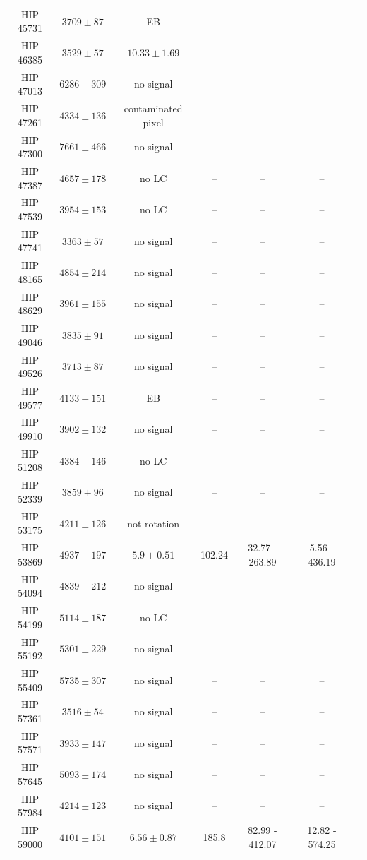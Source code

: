 \begin{longtable}{|c|c|c|c|c|c|c|}
HIP 45731 & $ 3709 \pm 87 $ &EB &-- &-- &-- \\
HIP 46385 & $ 3529 \pm 57 $ & $ 10.33 \pm 1.69 $ &-- &-- &-- \\
HIP 47013 & $ 6286 \pm 309 $ & no signal &-- &-- &-- \\
HIP 47261 & $ 4334 \pm 136 $ & contaminated pixel &-- &-- &-- \\
HIP 47300 & $ 7661 \pm 466 $ & no signal &-- &-- &-- \\
HIP 47387 & $ 4657 \pm 178 $ & no LC &-- &-- &-- \\
HIP 47539 & $ 3954 \pm 153 $ & no LC &-- &-- &-- \\
HIP 47741 & $ 3363 \pm 57 $ & no signal &-- &-- &-- \\
HIP 48165 & $ 4854 \pm 214 $ & no signal &-- &-- &-- \\
HIP 48629 & $ 3961 \pm 155 $ & no signal &-- &-- &-- \\
HIP 49046 & $ 3835 \pm 91 $ & no signal &-- &-- &-- \\
HIP 49526 & $ 3713 \pm 87 $ & no signal &-- &-- &-- \\
HIP 49577 & $ 4133 \pm 151 $ &EB &-- &-- &-- \\
HIP 49910 & $ 3902 \pm 132 $ & no signal &-- &-- &-- \\
HIP 51208 & $ 4384 \pm 146 $ & no LC &-- &-- &-- \\
HIP 52339 & $ 3859 \pm 96 $ & no signal &-- &-- &-- \\
HIP 53175 & $ 4211 \pm 126 $ & not rotation &-- &-- &-- \\
HIP 53869 & $ 4937 \pm 197 $ &$ 5.9 \pm 0.51 $ & 102.24 & 32.77 - 263.89 & 5.56 - 436.19 \\
HIP 54094 & $ 4839 \pm 212 $ & no signal &-- &-- &-- \\
HIP 54199 & $ 5114 \pm 187 $ & no LC &-- &-- &-- \\
HIP 55192 & $ 5301 \pm 229 $ & no signal &-- &-- &-- \\
HIP 55409 & $ 5735 \pm 307 $ & no signal &-- &-- &-- \\
HIP 57361 & $ 3516 \pm 54 $ & no signal &-- &-- &-- \\
HIP 57571 & $ 3933 \pm 147 $ & no signal &-- &-- &-- \\
HIP 57645 & $ 5093 \pm 174 $ & no signal &-- &-- &-- \\
HIP 57984 & $ 4214 \pm 123 $ & no signal &-- &-- &-- \\
HIP 59000 & $ 4101 \pm 151 $ &$ 6.56 \pm 0.87 $ & 185.8 & 82.99 - 412.07 & 12.82 - 574.25 \\

\end{longtable}
